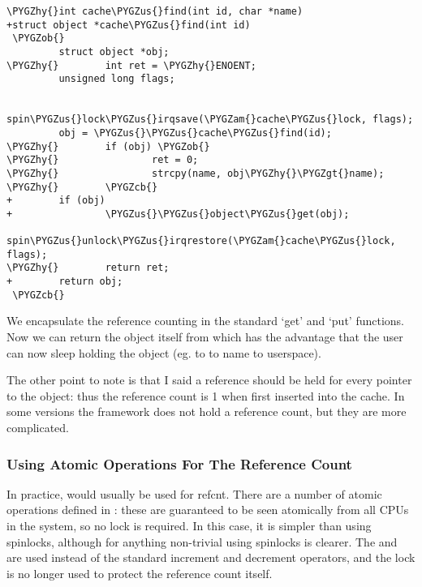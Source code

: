 \documentclass[a4paper,8pt,english]{sphinxmanual}
\def\PYGZus{\char`\_}
\def\PYGZob{\char`\{}
\def\PYGZcb{\char`\}}
\def\PYGZam{\char`\&}
\def\PYGZgt{\char`\>}
\def\PYGZhy{\char`\-}
\begin{document}
\begin{Verbatim}[commandchars=\\\{\}]
\PYGZhy{}int cache\PYGZus{}find(int id, char *name)
+struct object *cache\PYGZus{}find(int id)
 \PYGZob{}
         struct object *obj;
\PYGZhy{}        int ret = \PYGZhy{}ENOENT;
         unsigned long flags;

         spin\PYGZus{}lock\PYGZus{}irqsave(\PYGZam{}cache\PYGZus{}lock, flags);
         obj = \PYGZus{}\PYGZus{}cache\PYGZus{}find(id);
\PYGZhy{}        if (obj) \PYGZob{}
\PYGZhy{}                ret = 0;
\PYGZhy{}                strcpy(name, obj\PYGZhy{}\PYGZgt{}name);
\PYGZhy{}        \PYGZcb{}
+        if (obj)
+                \PYGZus{}\PYGZus{}object\PYGZus{}get(obj);
         spin\PYGZus{}unlock\PYGZus{}irqrestore(\PYGZam{}cache\PYGZus{}lock, flags);
\PYGZhy{}        return ret;
+        return obj;
 \PYGZcb{}
\end{Verbatim}

We encapsulate the reference counting in the standard `get' and `put'
functions. Now we can return the object itself from
 which has the advantage that the user can
now sleep holding the object (eg. to  to
name to userspace).

The other point to note is that I said a reference should be held for
every pointer to the object: thus the reference count is 1 when first
inserted into the cache. In some versions the framework does not hold a
reference count, but they are more complicated.


\subsubsection{Using Atomic Operations For The Reference Count}
\label{kernel-hacking/locking:using-atomic-operations-for-the-reference-count}
In practice,  would usually be used for refcnt. There are a
number of atomic operations defined in : these
are guaranteed to be seen atomically from all CPUs in the system, so no
lock is required. In this case, it is simpler than using spinlocks,
although for anything non-trivial using spinlocks is clearer. The
 and 
are used instead of the standard increment and decrement operators, and
the lock is no longer used to protect the reference count itself.
\end{document}
